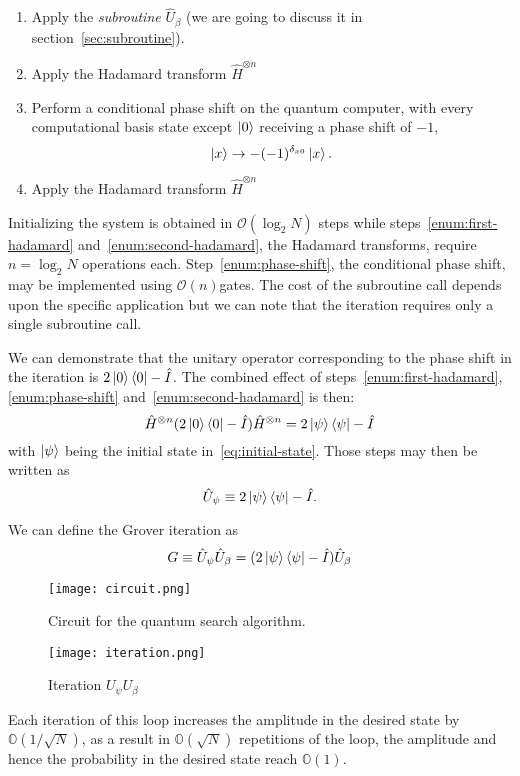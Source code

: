 \begin{enumerate}
  \item Apply the \emph{subroutine} $\hat{U}_\beta$ (we are going to discuss it in section~\ref{sec:subroutine}).
  \item Apply the Hadamard transform $\hat{H}^{\otimes n}$ \label{enum:first-hadamard}
  \item \label{enum:phase-shift} Perform a conditional phase shift on the quantum computer, with every computational basis state except $\ket{0}$ receiving a phase shift of $-1$,
  \begin{equation*}
      \ket{x} \rightarrow -(-1)^{\delta_{x0}} \ket{x}.
  \end{equation*}
  \item Apply the Hadamard transform $\hat{H}^{\otimes n}$ \label{enum:second-hadamard}
\end{enumerate}
Initializing the system is obtained in $\mathcal{O}(\log_2{N})$ steps while steps~\ref{enum:first-hadamard} and~\ref{enum:second-hadamard}, the Hadamard transforms, require $n=\log_2{N}$ operations each. Step~\ref{enum:phase-shift}, the conditional phase shift, may be implemented using $\mathcal{O}(n)$gates. The cost of the subroutine call depends upon the specific application but we can note that the iteration requires only a single subroutine call.


\begin{defn}
We can demonstrate that the unitary operator corresponding to the phase shift in the iteration is $2\ket{0}\bra{0}-\hat{I}$. The combined effect of steps~\ref{enum:first-hadamard},\ref{enum:phase-shift} and~\ref{enum:second-hadamard} is then:
\begin{equation*}
    \hat{H}^{\otimes n} (2\ket{0}\bra{0}-\hat{I}) \hat{H}^{\otimes n} =  2\ket{\psi}\bra{\psi}-\hat{I}
\end{equation*}
with $\ket{\psi}$ being the initial state in~\ref{eq:initial-state}. Those steps may then be written as
\begin{equation*}
    \hat{U}_\psi \equiv 2 \ket{\psi}\bra{\psi} - \hat{I}.
\end{equation*}
\end{defn}
\begin{defn}
We can define the Grover iteration as
\begin{equation}\label{def:grover-iteration}
G \equiv \hat{U}_\psi\hat{U}_\beta = (2 \ket{\psi}\bra{\psi} - \hat{I}) \hat{U}_\beta
\end{equation}
\end{defn}
\begin{figure}
\texttt{[image: circuit.png]}
\centering
\caption{Circuit for the quantum search algorithm.}
\end{figure}
\begin{figure}
\texttt{[image: iteration.png]}
\centering
\caption{Iteration $U_\psi U_\beta$}
\end{figure}
Each iteration of this loop increases the amplitude in the desired state by $\mathbb{O}(1/\sqrt{N})$, as a result in $\mathbb{O}(\sqrt{N})$ repetitions of the loop, the amplitude and hence the probability in the desired state reach $\mathbb{O}(1)$.

